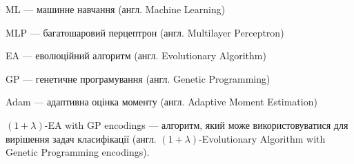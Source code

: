 ML --- машинне навчання (англ. Machine Learning)

MLP --- багатошаровий перцептрон (англ. Multilayer Perceptron)

EA --- еволюційний алгоритм (англ. Evolutionary Algorithm)

GP --- генетичне програмування (англ. Genetic Programming)

Adam --- адаптивна оцінка моменту (англ. Adaptive Moment Estimation)

$(1+\lambda)$-EA with GP encodings --- алгоритм, який може використовуватися для вирішення задач класифікації (англ. $(1+\lambda)$-Evolutionary Algorithm with Genetic Programming encodings).